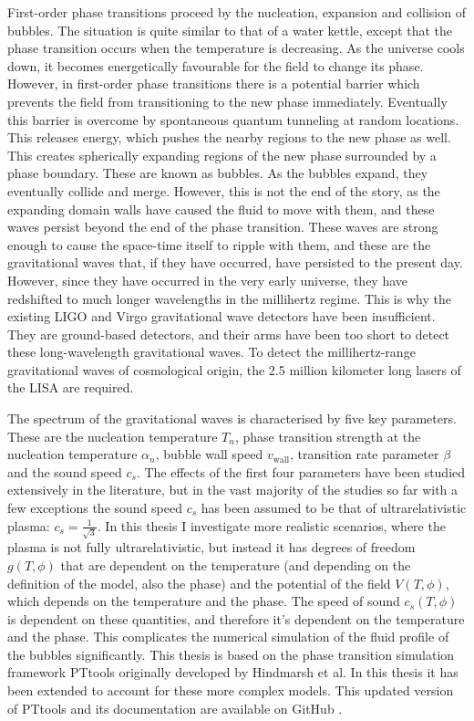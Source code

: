 First-order phase transitions proceed by the nucleation, expansion and collision of bubbles.
The situation is quite similar to that of a water kettle,
except that the phase transition occurs when the temperature is decreasing.
As the universe cools down,
it becomes energetically favourable for the field to change its phase.
However, in first-order phase transitions there is a potential barrier which prevents the field from transitioning to the new phase immediately.
Eventually this barrier is overcome by spontaneous quantum tunneling at random locations.
This releases energy, which pushes the nearby regions to the new phase as well.
This creates spherically expanding regions of the new phase surrounded by a phase boundary.
These are known as bubbles.
As the bubbles expand, they eventually collide and merge.
However, this is not the end of the story,
as the expanding domain walls have caused the fluid to move with them,
and these waves persist beyond the end of the phase transition.
These waves are strong enough to cause the space-time itself to ripple with them,
and these are the gravitational waves that, if they have occurred, have persisted to the present day.
However, since they have occurred in the very early universe, they have redshifted to much longer wavelengths in the millihertz regime.
This is why the existing LIGO and Virgo gravitational wave detectors have been insufficient.
They are ground-based detectors, and their arms have been too short to detect these long-wavelength gravitational waves.
To detect the millihertz-range gravitational waves of cosmological origin, the 2.5 million kilometer long lasers of the LISA are required.
\cite{lecture_notes}

The spectrum of the gravitational waves is characterised by five key parameters.
These are the nucleation temperature $T_n$,
phase transition strength at the nucleation temperature $\alpha_n$,
bubble wall speed $v_{\text{wall}}$,
transition rate parameter $\beta$
and the sound speed $c_s$.
\cite{lecture_notes}
The effects of the first four parameters have been studied extensively in the literature,
but in the vast majority of the studies so far with a few exceptions
\cites{giese_2020}{giese_2021}{tenkanen_speed_2022}{tian_gw_2024}
the sound speed $c_s$ has been assumed to be that of ultrarelativistic plasma: $c_s = \frac{1}{\sqrt{3}}$.
In this thesis I investigate more realistic scenarios, where the plasma is not fully ultrarelativistic,
but instead it has degrees of freedom $g(T,\phi)$ that are dependent on the temperature (and depending on the definition of the model, also the phase) and the potential of the field $V(T,\phi)$,
which depends on the temperature and the phase.
The speed of sound $c_s(T,\phi)$ is dependent on these quantities,
and therefore it's dependent on the temperature and the phase.
This complicates the numerical simulation of the fluid profile of the bubbles significantly.
This thesis is based on the phase transition simulation framework PTtools originally developed by Hindmarsh et al.
In this thesis it has been extended to account for these more complex models.
This updated version of PTtools and its documentation are available on GitHub \cite{pttools}.

